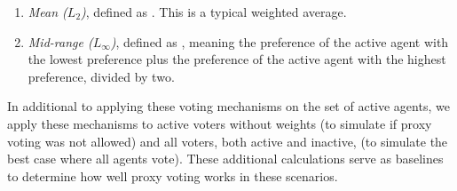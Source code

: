 \begin{enumerate}
{        preference in the higher half of the weighted median.
    }
    \item {
        \textit{Mean ($L_2$)}, defined as
        $$.
        This is a typical weighted average.
    }
    \item {
        \textit{Mid-range ($L_\infty$)}, defined as
        $$, meaning the preference
        of the active agent with the lowest preference plus the preference of the
        active agent with the highest preference, divided by two.

    }
\end{enumerate}
In additional to applying these voting mechanisms on the set of active agents, we
apply these mechanisms to active voters without weights (to simulate if proxy voting was
not allowed) and all voters, both active and inactive, (to simulate the best case
where all agents vote).
These additional calculations serve as baselines to determine how well proxy voting
works in these scenarios.

